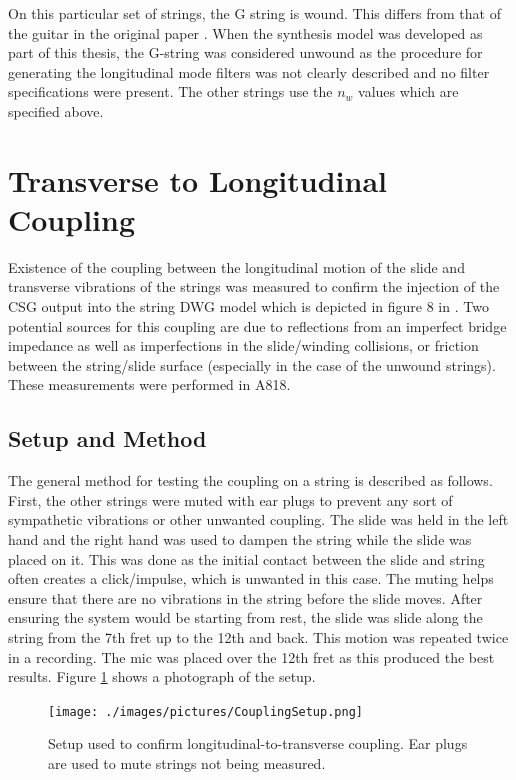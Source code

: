 \documentclass[../main.tex]{subfiles}
\begin{document}
On this particular set of strings, the G string is wound. This differs from that of the guitar in the original paper . When the synthesis model was developed as part of this thesis, the G-string was considered unwound as the procedure for generating the longitudinal mode filters was not clearly described and no filter specifications were present. The other strings use the $n_w$ values which are specified above.

\section{Transverse to Longitudinal Coupling}
Existence of the coupling between the longitudinal motion of the slide and transverse vibrations of the strings was measured to confirm the injection of the CSG output into the string DWG model which is depicted in figure 8 in . Two potential sources for this coupling are due to reflections from an imperfect bridge impedance as well as imperfections in the slide/winding collisions, or friction between the string/slide surface (especially in the case of the unwound strings). These measurements were performed in A818.

\subsection{Setup and Method}
The general method for testing the coupling on a string is described as follows. First, the other strings were muted with ear plugs to prevent any sort of sympathetic vibrations or other unwanted coupling. The slide was held in the left hand and the right hand was used to dampen the string while the slide was placed on it. This was done as the initial contact between the slide and string often creates a click/impulse, which is unwanted in this case. The muting helps ensure that there are no vibrations in the string before the slide moves. After ensuring the system would be starting from rest, the slide was slide along the string from the 7th fret up to the 12th and back. This motion was repeated twice in a recording. The mic was placed over the 12th fret as this produced the best results. Figure \ref{fig:CouplingSetup} shows a photograph of the setup.

\begin{figure}[h]
    \centering
    \texttt{[image: ./images/pictures/CouplingSetup.png]}
    \caption{Setup used to confirm longitudinal-to-transverse coupling. Ear plugs are used to mute strings not being measured.}
    \label{fig:CouplingSetup}
\end{figure}
\end{document}
